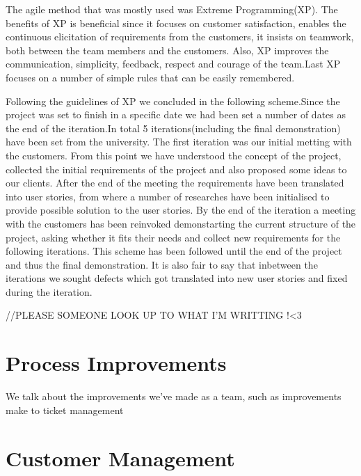 \documentclass{l3proj}
\begin{document}
The agile method that was mostly used was Extreme Programming(XP). The benefits of XP is beneficial since it focuses on
customer satisfaction, enables the continuous elicitation of requirements from the customers, it insists on teamwork,
both between the team members and the customers. Also, XP improves the communication, simplicity, feedback, respect and
courage of the team.Last XP focuses on a number of simple  rules that can be easily remembered.

Following the guidelines of XP we concluded in the following scheme.Since the project  was set to finish in a specific date
we had been set a number of dates as the end of the iteration.In total 5 iterations(including the final demonstration)
have been set from the university. The first iteration was  our initial metting with the customers.
From this point we have understood the concept of the project, collected  the initial requirements of the project
and also proposed some ideas to our clients. After the end of the meeting the requirements have been translated into user
 stories, from where a number of researches have been initialised to provide possible solution to the user stories. By the
 end of the iteration a meeting with the customers has been reinvoked demonstarting the current structure of the project,
 asking whether it fits their needs and collect new requirements for the following iterations. This scheme has been followed
 until the end of the project and thus the final demonstration. It is also fair to say that inbetween the iterations we
 sought defects which got translated into new user stories and fixed during the iteration.

//PLEASE SOMEONE LOOK UP TO WHAT I'M WRITTING !<3

\section{Process Improvements}
\label{managing}

We talk about the improvements we've made as a team, such as improvements make to ticket management


\section{Customer Management}
\label{sec:managing}
\end{document}
